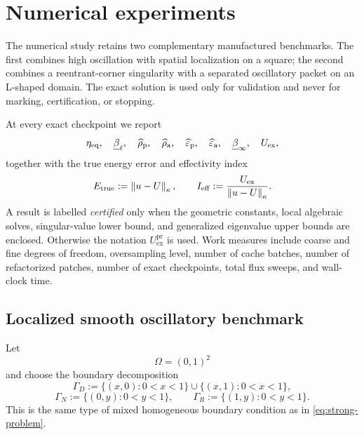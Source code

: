 \section{Numerical experiments}
\label{sec:numerics}

The numerical study retains two complementary manufactured benchmarks.
The first combines high oscillation with spatial localization on a square;
the second combines a reentrant-corner singularity with a separated
oscillatory packet on an L-shaped domain.  The exact solution is used only
for validation and never for marking, certification, or stopping.

At every exact checkpoint we report
\begin{equation}
\label{eq:numerical-certificate-components}
  \eta_{\mathrm{eq}},
  \quad\underline\beta_\ell,
  \quad\widehat\rho_{\mathrm p},
  \quad\widehat\rho_{\mathrm a},
  \quad\widehat\varepsilon_{\mathrm p},
  \quad\widehat\varepsilon_{\mathrm a},
  \quad\underline\beta_\infty,
  \quad U_{\mathrm{ex}},
\end{equation}
together with the true energy error and effectivity index
\begin{equation}
\label{eq:effectivity}
  E_{\mathrm{true}}:=\left\lVert u-U\right\rVert_\kappa,
  \qquad
  I_{\mathrm{eff}}:=\frac{U_{\mathrm{ex}}}{\left\lVert u-U\right\rVert_\kappa}.
\end{equation}
A result is labelled \emph{certified} only when the geometric constants,
local algebraic solves, singular-value lower bound, and generalized
eigenvalue upper bounds are enclosed.  Otherwise the notation
$U_{\mathrm{ex}}^{\mathrm{pr}}$ is used.  Work measures include coarse and
fine degrees of freedom, oversampling level, number of cache batches,
number of refactorized patches, number of exact checkpoints, total flux
sweeps, and wall-clock time.

\subsection{Localized smooth oscillatory benchmark}
\label{sec:num-smooth}

Let
\[
  \Omega=(0,1)^2
\]
and choose the boundary decomposition
\begin{equation}
\label{eq:smooth-boundary-partition}
  \Gamma_D
  :=
  \{(x,0):0<x<1\}
  \cup
  \{(x,1):0<x<1\},
\end{equation}
\[
  \Gamma_N
  :=
  \{(0,y):0<y<1\},
  \qquad
  \Gamma_R
  :=
  \{(1,y):0<y<1\}.
\]
This is the same type of mixed homogeneous boundary condition as in
\eqref{eq:strong-problem}.

